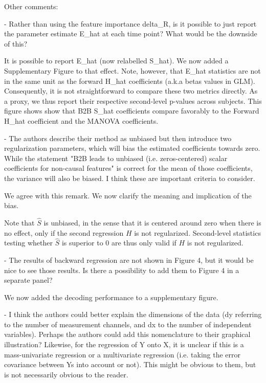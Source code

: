Other comments:

- Rather than using the feature importance delta_R, is it possible to just
    report the parameter estimate E_hat at each time point? What would be the
    downside of this?

It is possible to report E_hat (now relabelled S_hat). We now added a Supplementary Figure
to that effect. Note, however, that E_hat statistics are not in the same unit as the forward H_hat
coefficients (a.k.a betas values in GLM). Consequently, it is not straightforward to
compare these two metrics directly. As a proxy, we thus report their respective
second-level p-values across subjects. This figure shows show that B2B S_hat
coefficients compare favorably to the Forward H_hat coefficient and the MANOVA coefficients.

- The authors describe their method as unbiased but then introduce two
    regularization parameters, which will bias the estimated coefficients towards
    zero. While the statement "B2B leads to unbiased (i.e. zeros-centered) scalar
    coefficients for non-causal features" is correct for the mean of those
    coefficients, the variance will also be biased. I think these are important
    criteria to consider.

We agree with this remark. We now clarify the meaning and implication of the bias.

Note that $\hat S$ is unbiased, in the sense that it is centered around zero when there is no
effect, only if the second regression $H$ is not regularized. Second-level
statistics testing whether $\hat S$ is superior to 0 are thus only valid if $H$
is not regularized.

- The results of backward regression are not shown in Figure 4, but it would be
    nice to see those results. Is there a possibility to add them to Figure 4 in a
    separate panel?

We now added the decoding performance to a supplementary figure.

- I think the authors could better explain the dimensions of the data (dy
    referring to the number of measurement channels, and dx to the number of
    independent variables). Perhaps the authors could add this nomenclature to their
    graphical illustration? Likewise, for the regression of Y onto X, it is unclear
    if this is a mass-univariate regression or a multivariate regression (i.e.
    taking the error covariance between Ys into account or not). This might be
    obvious to them, but is not necessarily obvious to the reader.


